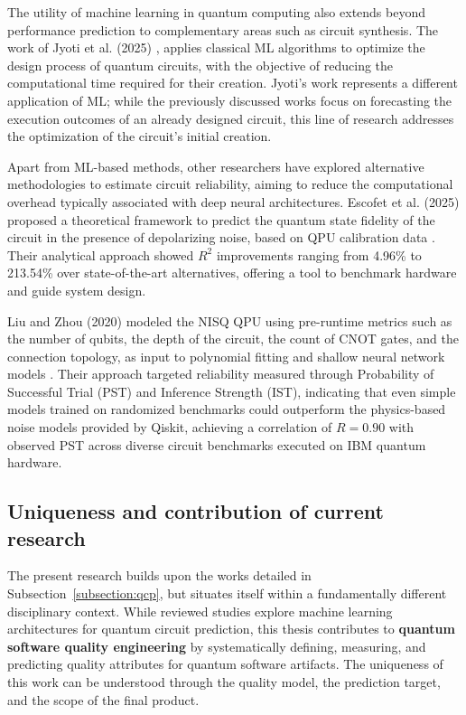 \documentclass{article}
\begin{document}
The utility of machine learning in quantum computing also extends beyond performance prediction to complementary areas such as circuit synthesis. The work of Jyoti et al. (2025) \cite{jyotiStudyMachineLearningb_2025}, applies classical ML algorithms to optimize the design process of quantum circuits, with the objective of reducing the computational time required for their creation. Jyoti's work represents a different application of ML; while the previously discussed works focus on forecasting the execution outcomes of an already designed circuit, this line of research addresses the optimization of the circuit's initial creation.

Apart from ML-based methods, other researchers have explored alternative methodologies to estimate circuit reliability, aiming to reduce the computational overhead typically associated with deep neural architectures. Escofet et al. (2025) proposed a theoretical framework to predict the quantum state fidelity of the circuit in the presence of depolarizing noise, based on QPU calibration data \cite{escofetAccurateEfficientAnalytic_2025}. Their analytical approach showed $R^2$ improvements ranging from 4.96\% to 213.54\% over state-of-the-art alternatives, offering a tool to benchmark hardware and guide system design.

Liu and Zhou (2020) modeled the NISQ QPU using pre-runtime metrics such as the number of qubits, the depth of the circuit, the count of CNOT gates, and the connection topology, as input to polynomial fitting and shallow neural network models \cite{liuReliabilityModelingNISQ_2020}. Their approach targeted reliability measured through Probability of Successful Trial (PST) and Inference Strength (IST), indicating that even simple models trained on randomized benchmarks could outperform the physics-based noise models provided by Qiskit, achieving a correlation of $R = 0.90$ with observed PST across diverse circuit benchmarks executed on IBM quantum hardware.

\subsection{Uniqueness and contribution of current research}

The present research builds upon the works detailed in Subsection~\ref{subsection:qcp}, but situates itself within a fundamentally different disciplinary context. While reviewed studies explore machine learning architectures for quantum circuit prediction, this thesis contributes to \textbf{quantum software quality engineering} by systematically defining, measuring, and predicting quality attributes for quantum software artifacts. The uniqueness of this work can be understood through the quality model, the prediction target, and the scope of the final product.
\end{document}
